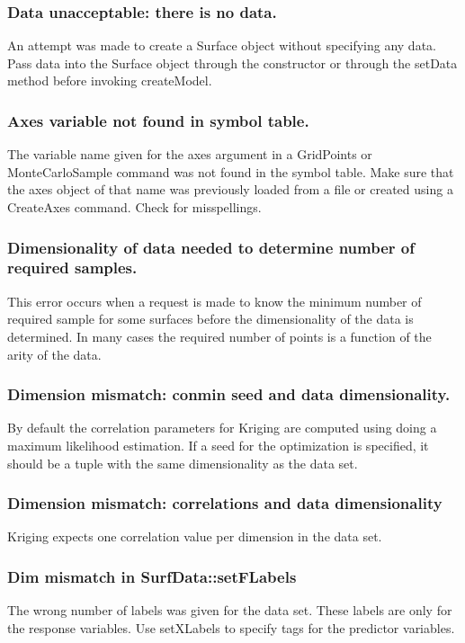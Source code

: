 \documentclass{article}
\begin{document}
\subsubsection{Data unacceptable: there is no data.}
An attempt was made to create a Surface object without specifying any data.
Pass data into the Surface object through the constructor or through the setData
method before invoking createModel.

\subsubsection{Axes variable not found in symbol table.}
The variable name given for the axes argument in a GridPoints or
MonteCarloSample command was not found in the symbol table.  Make sure that the
axes object of that name was previously loaded from a file or created using a
CreateAxes command.  Check for misspellings.

\subsubsection{Dimensionality of data needed to determine number of required samples.}
This error occurs when a request is made to know the minimum number of required
sample for some surfaces before the dimensionality of the data is determined.
In many cases the required number of points is a function of the arity of the
data.

\subsubsection{Dimension mismatch: conmin seed and data dimensionality.}
By default the correlation parameters for Kriging are computed using doing a
maximum likelihood estimation.  If a seed for the optimization is specified, it
should be a tuple with the same dimensionality as the data set.

\subsubsection{Dimension mismatch: correlations and data dimensionality}
Kriging expects one correlation value per dimension in the data set.

\subsubsection{Dim mismatch in SurfData::setFLabels}
The wrong number of labels was given for the data set.  These labels are only
for the response variables.  Use setXLabels to specify tags for the predictor
variables.
\end{document}

